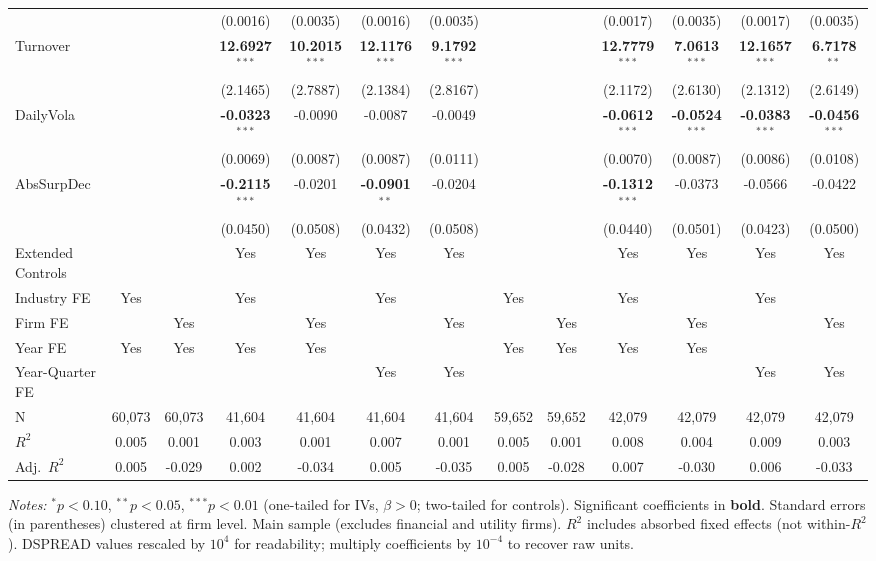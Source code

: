 \begin{landscape}
\begin{table}[H]
\begin{tabular}{lcccccccccccc}
 &  &  & (0.0016) & (0.0035) & (0.0016) & (0.0035) &  &  & (0.0017) & (0.0035) & (0.0017) & (0.0035) \\
Turnover &  &  & \textbf{12.6927}$^{***}$ & \textbf{10.2015}$^{***}$ & \textbf{12.1176}$^{***}$ & \textbf{9.1792}$^{***}$ &  &  & \textbf{12.7779}$^{***}$ & \textbf{7.0613}$^{***}$ & \textbf{12.1657}$^{***}$ & \textbf{6.7178}$^{**}$ \\
 &  &  & (2.1465) & (2.7887) & (2.1384) & (2.8167) &  &  & (2.1172) & (2.6130) & (2.1312) & (2.6149) \\
DailyVola &  &  & \textbf{-0.0323}$^{***}$ & -0.0090 & -0.0087 & -0.0049 &  &  & \textbf{-0.0612}$^{***}$ & \textbf{-0.0524}$^{***}$ & \textbf{-0.0383}$^{***}$ & \textbf{-0.0456}$^{***}$ \\
 &  &  & (0.0069) & (0.0087) & (0.0087) & (0.0111) &  &  & (0.0070) & (0.0087) & (0.0086) & (0.0108) \\
AbsSurpDec &  &  & \textbf{-0.2115}$^{***}$ & -0.0201 & \textbf{-0.0901}$^{**}$ & -0.0204 &  &  & \textbf{-0.1312}$^{***}$ & -0.0373 & -0.0566 & -0.0422 \\
 &  &  & (0.0450) & (0.0508) & (0.0432) & (0.0508) &  &  & (0.0440) & (0.0501) & (0.0423) & (0.0500) \\
\midrule
Extended Controls &  &  & Yes & Yes & Yes & Yes &  &  & Yes & Yes & Yes & Yes \\
Industry FE & Yes &  & Yes &  & Yes &  & Yes &  & Yes &  & Yes &  \\
Firm FE &  & Yes &  & Yes &  & Yes &  & Yes &  & Yes &  & Yes \\
Year FE & Yes & Yes & Yes & Yes &  &  & Yes & Yes & Yes & Yes &  &  \\
Year-Quarter FE &  &  &  &  & Yes & Yes &  &  &  &  & Yes & Yes \\
\midrule
N & 60,073 & 60,073 & 41,604 & 41,604 & 41,604 & 41,604 & 59,652 & 59,652 & 42,079 & 42,079 & 42,079 & 42,079 \\
$R^2$ & 0.005 & 0.001 & 0.003 & 0.001 & 0.007 & 0.001 & 0.005 & 0.001 & 0.008 & 0.004 & 0.009 & 0.003 \\
Adj.~$R^2$ & 0.005 & -0.029 & 0.002 & -0.034 & 0.005 & -0.035 & 0.005 & -0.028 & 0.007 & -0.030 & 0.006 & -0.033 \\
\bottomrule
\end{tabular}
\begin{minipage}{\linewidth}
\vspace{2pt}\scriptsize
\textit{Notes:} $^{*}p<0.10$, $^{**}p<0.05$, $^{***}p<0.01$ (one-tailed for IVs, $\beta > 0$; two-tailed for controls).
 Significant coefficients in \textbf{bold}.
 Standard errors (in parentheses) clustered at firm level.
 Main sample (excludes financial and utility firms).
 $R^2$ includes absorbed fixed effects (not within-$R^2$).
 DSPREAD values rescaled by $10^4$ for readability; multiply coefficients by $10^{-4}$ to recover raw units.
\end{minipage}
\end{table}
\end{landscape}